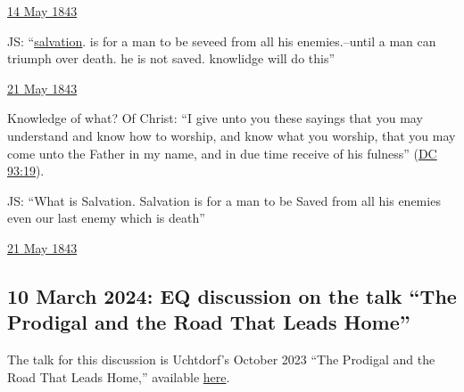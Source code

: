 \begin{compactitem}
\begin{compactitem}
						\begin{compactitem}
							\item \hyperlink{EMS-1843-JS-14-MAY-1843-A-WW-a}{14 May 1843}
						\end{compactitem}
					\item JS: ``\uline{salvation}. is for a man to be seveed from all his enemies.--until a man can triumph over death. he is not saved. knowlidge will do this''
						\begin{compactitem}
							\item \hyperref[EMS-1843-JS-21-MAY-1843-WR]{21 May 1843}
							\item Knowledge of what? Of Christ: ``I give unto you these sayings that you may understand and know how to worship, and know what you worship, that you may come unto the Father in my name, and in due time receive of his fulness'' (\hyperref[DC93-19]{DC 93:19}).
						\end{compactitem}
					\item JS: ``What is Salvation. Salvation is for a man to be Saved from all his enemies even our last enemy which is death''
						\begin{compactitem}
							\item \hyperref[EMS-1843-JS-21-MAY-1843-HC]{21 May 1843}
						\end{compactitem}
				\end{compactitem}
		
		\end{compactitem}
	
	\subsection{10 March 2024: EQ discussion on the talk ``The Prodigal and the Road That Leads Home''}
		\label{TALKS-03-10-2024}
		
		The talk for this discussion is Uchtdorf's October 2023 ``The Prodigal and the Road That Leads Home,'' available \href{https://www.churchofjesuschrist.org/study/general-conference/2023/10/45uchtdorf?lang=eng}{here}.
		
